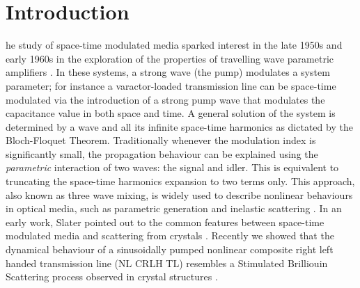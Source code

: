 \documentclass[journal]{IEEEtran}
\begin{document}
%
\IEEEpeerreviewmaketitle



\section{Introduction}
% 
% 
% 
% 
he study of space-time modulated media sparked interest in the late 1950s and early 1960s in the exploration of the properties of travelling wave parametric amplifiers \cite{Tien1958, Cullen1958, Simon1960, Oliner1961, Cassedy1963, Cassedy1967}. In these systems, a strong wave (the pump) modulates a system parameter; for instance a varactor-loaded transmission line can be space-time modulated via the introduction of a strong pump wave that modulates the capacitance value in both space and time. A general solution of the system is determined by a wave and all its infinite space-time harmonics as dictated by the Bloch-Floquet Theorem. Traditionally whenever the modulation index is significantly small, the propagation behaviour can be explained using the \emph{parametric} interaction of  two waves: the signal and idler. This is equivalent to truncating the space-time harmonics expansion to two terms only. This approach, also known as three wave mixing, is widely used to describe nonlinear behaviours in optical media, such as parametric generation and inelastic scattering \cite{Boyd, Fabelinskii}. In an early work, Slater pointed out to the common features between space-time modulated media and scattering from crystals \cite{Slater1958}. Recently we showed that the dynamical behaviour of a sinusoidally pumped nonlinear composite right left handed transmission line (NL CRLH TL) resembles a Stimulated Brilliouin Scattering process observed in crystal structures \cite{Sameh_JAP_NLD, Boyd}.
\end{document}
